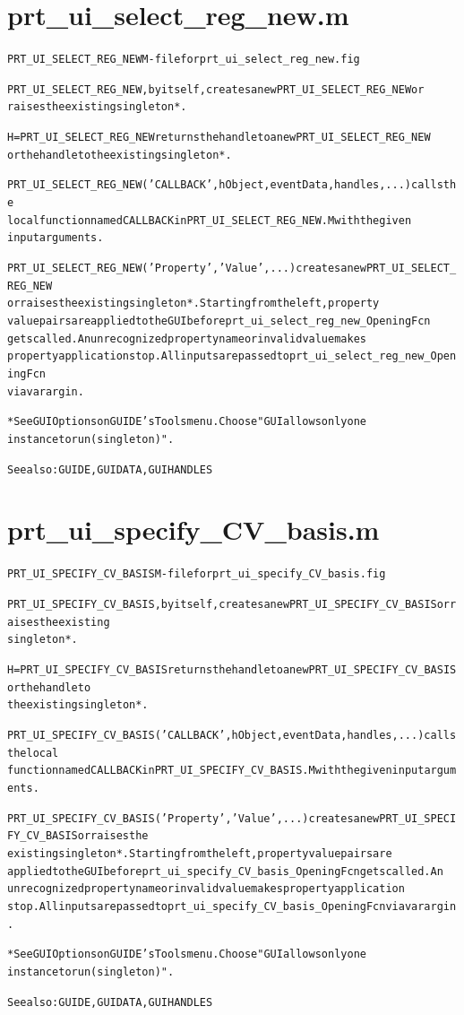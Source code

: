 \section{prt\_ui\_select\_reg\_new.m}
\begin{alltt}

 PRT\_UI\_SELECT\_REG\_NEW M-file for prt\_ui\_select\_reg\_new.fig
 
 PRT\_UI\_SELECT\_REG\_NEW, by itself, creates a new PRT\_UI\_SELECT\_REG\_NEW or 
 raises the existing singleton*.
 
 H = PRT\_UI\_SELECT\_REG\_NEW returns the handle to a new PRT\_UI\_SELECT\_REG\_NEW 
 or the handle to the existing singleton*.
 
 PRT\_UI\_SELECT\_REG\_NEW('CALLBACK',hObject,eventData,handles,...) calls the 
 local function named CALLBACK in PRT\_UI\_SELECT\_REG\_NEW.M with the given 
 input arguments.
 
 PRT\_UI\_SELECT\_REG\_NEW('Property','Value',...) creates a new PRT\_UI\_SELECT\_REG\_NEW
 or raises the existing singleton*.  Starting from the left, property 
 value pairs are applied to the GUI before prt\_ui\_select\_reg\_new\_OpeningFcn 
 gets called.  An unrecognized property name or invalid value makes 
 property application stop.  All inputs are passed to prt\_ui\_select\_reg\_new\_OpeningFcn
 via varargin.
 
 *See GUI Options on GUIDE's Tools menu.  Choose "GUI allows only one
  instance to run (singleton)".
 
 See also: GUIDE, GUIDATA, GUIHANDLES
\end{alltt}


\section{prt\_ui\_specify\_CV\_basis.m}
\begin{alltt}

 PRT\_UI\_SPECIFY\_CV\_BASIS M-file for prt\_ui\_specify\_CV\_basis.fig
 
 PRT\_UI\_SPECIFY\_CV\_BASIS, by itself, creates a new PRT\_UI\_SPECIFY\_CV\_BASIS or raises the existing
 singleton*.
 
 H = PRT\_UI\_SPECIFY\_CV\_BASIS returns the handle to a new PRT\_UI\_SPECIFY\_CV\_BASIS or the handle to
 the existing singleton*.
 
 PRT\_UI\_SPECIFY\_CV\_BASIS('CALLBACK',hObject,eventData,handles,...) calls the local
 function named CALLBACK in PRT\_UI\_SPECIFY\_CV\_BASIS.M with the given input arguments.
 
 PRT\_UI\_SPECIFY\_CV\_BASIS('Property','Value',...) creates a new PRT\_UI\_SPECIFY\_CV\_BASIS or raises the
 existing singleton*.  Starting from the left, property value pairs are
 applied to the GUI before prt\_ui\_specify\_CV\_basis\_OpeningFcn gets called.  An
 unrecognized property name or invalid value makes property application
 stop.  All inputs are passed to prt\_ui\_specify\_CV\_basis\_OpeningFcn via varargin.
 
 *See GUI Options on GUIDE's Tools menu.  Choose "GUI allows only one
 instance to run (singleton)".
 
 See also: GUIDE, GUIDATA, GUIHANDLES
\end{alltt}


